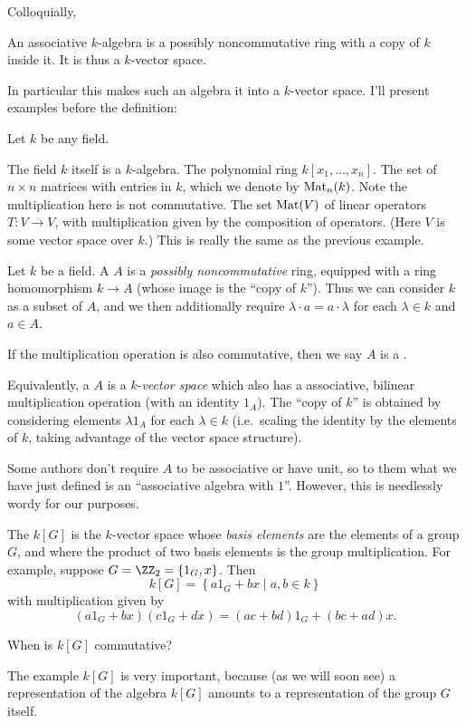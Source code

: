 Colloquially,
\begin{moral}
	An associative $k$-algebra is
	a possibly noncommutative ring with a copy of $k$ inside it.
	It is thus a $k$-vector space.
\end{moral}
In particular this makes such an algebra it into a $k$-vector space.
I'll present examples before the definition:
\begin{example}
	Let $k$ be any field.
	\begin{enumerate}[(a)]
		\ii The field $k$ itself is a $k$-algebra.
		\ii The polynomial ring $k[x_1, \dots, x_n]$.
		\ii The set of $n \times n$ matrices with entries in $k$,
		which we denote by $\mathrm{Mat}_n(k)$.
		Note the multiplication here is not commutative.
		\ii The set $\mathrm{Mat}(V)$ of linear operators $T : V \to V$,
		with multiplication given by the composition of operators.
		(Here $V$ is some vector space over $k$.)
		This is really the same as the previous example.
	\end{enumerate}
\end{example}
\begin{definition}
	Let $k$ be a field.
	A  $A$ is a \emph{possibly noncommutative} ring,
	equipped with a ring homomorphism $k \to A$
	(whose image is the ``copy of $k$'').
	Thus we can consider $k$ as a subset of $A$, and
	we then additionally require $\lambda \cdot a = a \cdot \lambda$
	for each $\lambda \in k$ and $a \in A$.

	If the multiplication operation is also commutative,
	then we say $A$ is a .
\end{definition}
\begin{definition}
	Equivalently, a  $A$ is a
	$k$-\emph{vector space} which also has a associative,
	bilinear multiplication operation (with an identity $1_A$).
	The ``copy of $k$'' is obtained by considering elements
	$\lambda 1_A$ for each $\lambda \in k$
	(i.e.\ scaling the identity by the elements of $k$,
	taking advantage of the vector space structure).
\end{definition}

\begin{abuse}
	Some authors don't require $A$ to be associative or have unit,
	so to them what we have just defined is an
	``associative algebra with $1$''.
	However, this is needlessly wordy for our purposes.
\end{abuse}

\begin{example}
	The  $k[G]$ is the $k$-vector space
	whose \emph{basis elements} are the elements of a group $G$,
	and where the product of two basis elements is the group multiplication.
	For example, suppose $G = \Zc 2 = \{1_G, x\}$.
	Then
	\[ k[G] = \left\{ a1_G + bx \mid a,b \in k \right\} \]
	with multiplication given by
	\[ (a1_G + bx)(c1_G+dx) = (ac+bd)1_G + (bc+ad)x. \]
\end{example}
\begin{ques}
	When is $k[G]$ commutative?
\end{ques}
The example $k[G]$ is very important,
because (as we will soon see) a representation of the algebra $k[G]$
amounts to a representation of the group $G$ itself.


